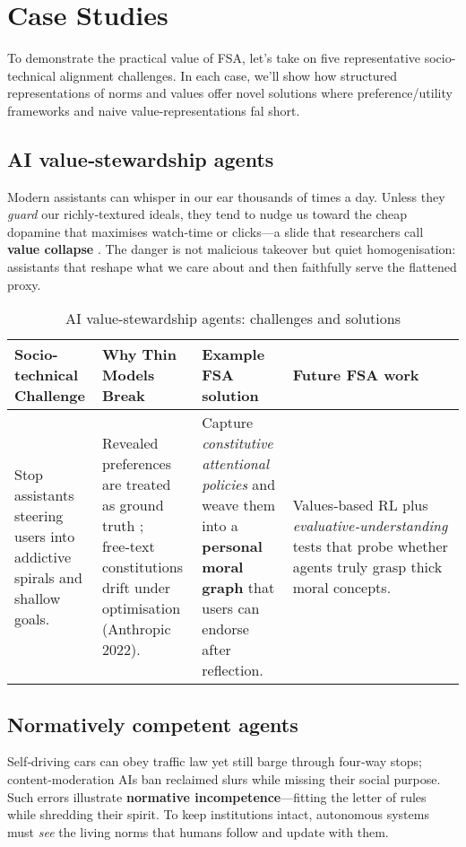 \section{Case Studies}
To demonstrate the practical value of FSA, let's take on five representative socio-technical alignment challenges. In each case, we'll show how structured representations of norms and values offer novel solutions where preference/utility frameworks and naive value-representations fal short.

\subsection{AI value‑stewardship agents}
Modern assistants can whisper in our ear thousands of times a day. Unless they \textit{guard} our richly‑textured ideals, they tend to nudge us toward the cheap dopamine that maximises watch‑time or clicks—a slide that researchers call \textbf{value collapse} \cite{stray2021}. The danger is not malicious takeover but quiet homogenisation: assistants that reshape what we care about and then faithfully serve the flattened proxy.

\begin{table*}[!htbp]
    \centering
    \small
    \begin{tabular}{p{}p{}p{}p{}}
        \toprule
        \textbf{Socio-technical Challenge} & \textbf{Why Thin Models Break} & \textbf{Example FSA solution} & \textbf{Future FSA work} \\
        \midrule
        Stop assistants steering users into addictive spirals and shallow goals. &
        Revealed preferences are treated as ground truth \cite{gul2001}; free‑text constitutions drift under optimisation (Anthropic 2022). &
        Capture \textit{constitutive attentional policies} and weave them into a \textbf{personal moral graph} \cite{klingefjord2024} that users can endorse after reflection. &
        Values‑based RL plus \textit{evaluative‑understanding} tests that probe whether agents truly grasp thick moral concepts. \\
        \bottomrule
    \end{tabular}
    \caption{AI value-stewardship agents: challenges and solutions}
    \label{tab:value-stewardship}
\end{table*}

\subsection{Normatively competent agents}
Self‑driving cars can obey traffic law yet still barge through four‑way stops; content‑moderation AIs ban reclaimed slurs while missing their social purpose. Such errors illustrate \textbf{normative incompetence}—fitting the letter of rules while shredding their spirit. To keep institutions intact, autonomous systems must \textit{see} the living norms that humans follow and update with them.

